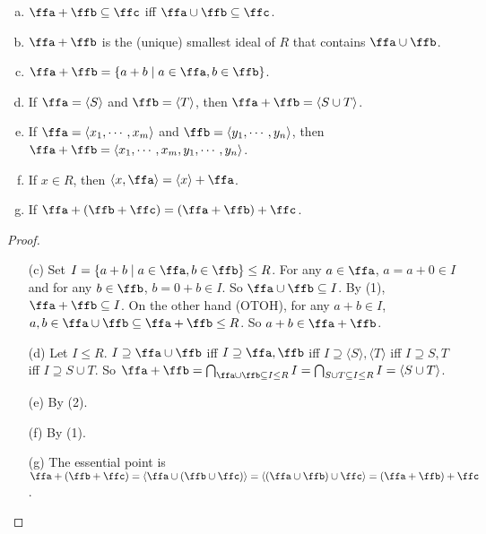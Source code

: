 \begin{fact}
    \begin{enumerate}[(a)]
        \item $\ffa + \ffb \subseteq \ffc$ iff $\ffa \cup \ffb \subseteq \ffc$.
        \item $\ffa + \ffb$ is the (unique) smallest ideal of $R$ that contains $\ffa \cup \ffb$.
        \item $\ffa + \ffb = \{a + b \mid a \in \ffa, b \in \ffb\}$.
        \item If $\ffa = \langle S \rangle$ and $\ffb = \langle T \rangle$, then $\ffa + \ffb = \langle S \cup T \rangle$.
        \item If $\ffa = \langle x_1,\cdots,x_m \rangle$ and $\ffb = \langle y_1,\cdots,y_n \rangle$, then $\ffa + \ffb = \langle x_1,\cdots,x_m, y_1,\cdots,y_n \rangle$.
        \item If $x \in R$, then $\langle x,\ffa \rangle = \langle x \rangle + \ffa$.
        \item If $\ffa + (\ffb + \ffc) = (\ffa + \ffb) + \ffc$.
    \end{enumerate}
\end{fact}

\begin{proof}
    \begin{enumerate}
        \item [(c)]
            Set $I = \{a+b \mid a \in \ffa,b \in \ffb\} \leq R$. For any $a \in \ffa$, $a = a + 0 \in I$ and for any $b \in \ffb$, $b = 0 + b \in I$. So $\ffa \cup \ffb \subseteq I$. By (1), $\ffa + \ffb \subseteq I$. On the other hand (OTOH), for any $a+b \in I$, $a,b \in \ffa \cup \ffb \subseteq \ffa + \ffb \leq R$. So $a + b \in \ffa + \ffb$.
        \item[(d)] Let $I \leq R$. $I \supseteq \ffa \cup \ffb$ iff $I \supseteq \ffa,\ffb$ iff $I \supseteq \langle S \rangle, \langle T \rangle$ iff $I \supseteq S,T$ iff $I \supseteq S \cup T$. So $\ffa + \ffb = \bigcap_{\ffa \cup \ffb \subseteq I \leq R} I = \bigcap_{S \cup T \subseteq I \leq R} I = \langle S \cup T \rangle$.
        \item[(e)] By (2).
        \item[(f)] By (1).
        \item[(g)] The essential point is $\ffa + (\ffb + \ffc) = \langle \ffa \cup (\ffb \cup \ffc) \rangle = \langle (\ffa \cup \ffb) \cup \ffc \rangle = (\ffa + \ffb) + \ffc$.
    \end{enumerate}
\end{proof}

